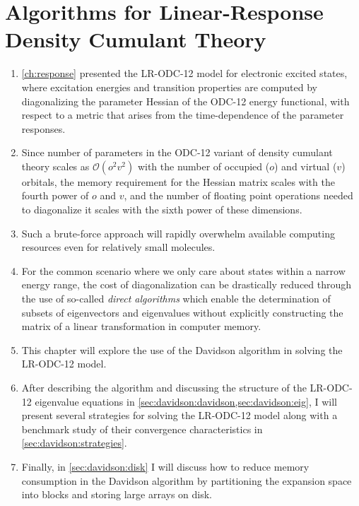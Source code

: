 \chapter[%
    Algorithms for Linear-Response Density Cumulant Theory
]{%
    Algorithms for Linear-Response Density Cumulant Theory
}
\label{ch:davidson}

\begin{enumerate}
    \item
        \cref{ch:response} presented the LR-ODC-12 model for electronic excited
        states, where excitation energies and transition properties are computed
        by diagonalizing the parameter Hessian of the ODC-12 energy functional,
        with respect to a metric that arises from the time-dependence of the
        parameter responses.
    \item
        Since number of parameters in the ODC-12 variant of density cumulant
        theory scales as
        \(
            \mathcal{O}(o^2v^2)
        \)
        with the number of occupied (\(o\)) and virtual (\(v\)) orbitals, the
        memory requirement for the Hessian matrix scales with the fourth power
        of \(o\) and \(v\), and the number of floating point operations needed
        to diagonalize it scales with the sixth power of these dimensions.
    \item
        Such a brute-force approach will rapidly overwhelm available computing
        resources even for relatively small molecules.
    \item
        For the common scenario where we only care about states within a narrow
        energy range, the cost of diagonalization can be drastically reduced
        through the use of so-called {\itshape direct algorithms} which enable
        the determination of subsets of eigenvectors and eigenvalues without
        explicitly constructing the matrix of a linear transformation in
        computer memory.
    \item
        This chapter will explore the use of the Davidson
        algorithm\cite{Liu:1978p49,Davidson:1975p87}
        in solving the LR-ODC-12 model.
    \item
        After describing the algorithm and discussing the structure of the
        LR-ODC-12 eigenvalue equations in
        \cref{sec:davidson:davidson,sec:davidson:eig}, I will present several
        strategies for solving the LR-ODC-12 model along with a benchmark study
        of their convergence characteristics in \cref{sec:davidson:strategies}.
    \item
        Finally, in \cref{sec:davidson:disk} I will discuss how to reduce memory
        consumption in the Davidson algorithm by partitioning the expansion
        space into blocks and storing large arrays on disk.
\end{enumerate}

